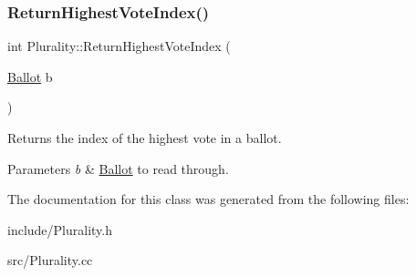 \subsubsection{\texorpdfstring{Return\+Highest\+Vote\+Index()}{ReturnHighestVoteIndex()}}
{\footnotesize\ttfamily int Plurality\+::\+Return\+Highest\+Vote\+Index (\begin{DoxyParamCaption}\item[{\mbox{\hyperlink{class_ballot}{Ballot}}}]{b }\end{DoxyParamCaption})}



Returns the index of the highest vote in a ballot. 


\begin{DoxyParams}{Parameters}
{\em b} & \mbox{\hyperlink{class_ballot}{Ballot}} to read through. \\
\hline
\end{DoxyParams}


The documentation for this class was generated from the following files\+:\begin{DoxyCompactItemize}
\item 
include/Plurality.\+h\item 
src/Plurality.\+cc\end{DoxyCompactItemize}
